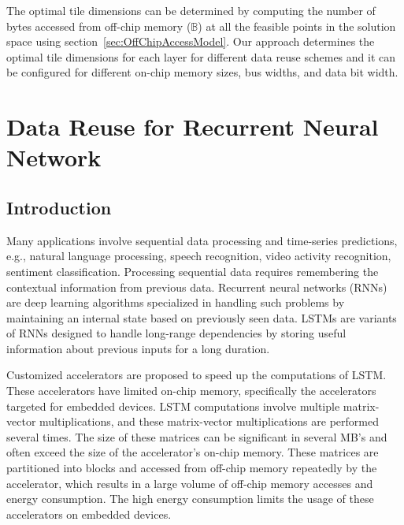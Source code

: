 \documentclass[a4paper,10pt]{article}
\newcommand{\numBytesOffChip}{\mathbb{B}}
\begin{document}
The optimal tile dimensions can be determined by computing the number of bytes accessed from off-chip memory ($\numBytesOffChip$) at all the feasible points in the solution space using section~\ref{sec:OffChipAccessModel}. Our approach determines the optimal tile dimensions for each layer for different data reuse schemes and it can be configured for different on-chip memory sizes, bus widths, and data bit width. 

\section{Data Reuse for Recurrent Neural Network}
\subsection{Introduction}
Many applications involve sequential data processing and time-series predictions, e.g., natural language processing, speech recognition, video activity recognition, sentiment classification. Processing sequential data requires remembering the contextual information from previous data. Recurrent neural networks (RNNs) are deep learning algorithms specialized in handling such problems by maintaining an internal state based on previously seen data. LSTMs \cite{hochreiter1997long} are variants of RNNs designed to handle long-range dependencies by storing useful information about previous inputs for a long duration. 

Customized accelerators are proposed to speed up the computations of LSTM. These accelerators have limited on-chip memory, specifically the accelerators targeted for embedded devices. LSTM computations involve multiple matrix-vector multiplications, and these matrix-vector multiplications are performed several times. The size of these matrices can be significant in several MB's and often exceed the size of the accelerator's on-chip memory. These matrices are partitioned into blocks and accessed from off-chip memory repeatedly by the accelerator, which results in a large volume of off-chip memory accesses and energy consumption. The high energy consumption limits the usage of these accelerators on embedded devices.
\end{document}
